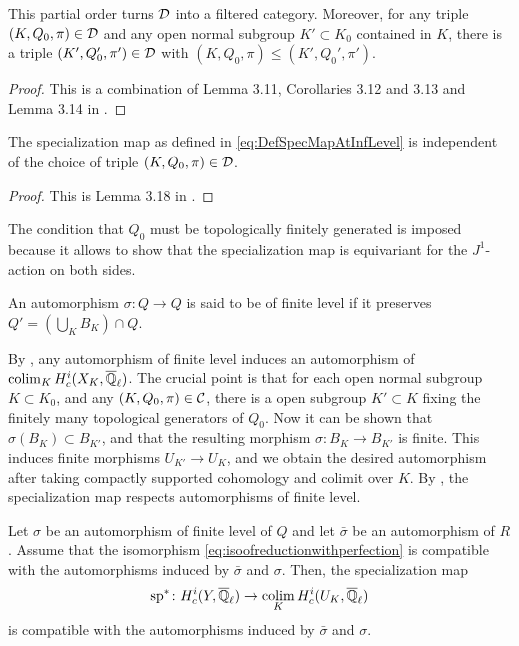 \documentclass[../main.tex]{subfiles}
\begin{document}
\begin{lem}\label{lem:MiedaCategoryOfChoicesIsFiltered}
  This partial order turns $\mathcal{D}$ into a filtered category. Moreover, for any
  triple $(K, Q_0, \pi) \in \mathcal{D}$ and any open normal subgroup $K' \subset K_0$ 
  contained in $K$, there is a triple $(K', Q_0', \pi') \in \mathcal{D}$ with $(K, Q_0,
  \pi) \leq (K', Q_0', \pi')$. 
\begin{proof}
  This is a combination of Lemma 3.11, Corollaries 3.12 and 3.13 and 
  Lemma 3.14 in \cite{mieda2016geometric}.
\end{proof}
\end{lem}

\begin{lem}\label{lem:specmapisindependentofchoice}
  The specialization map as defined in \eqref{eq:DefSpecMapAtInfLevel} is
  independent of the choice of triple $(K, Q_0, \pi) \in \mathcal{D}$. 
  \begin{proof}
    This is Lemma 3.18 in \cite{mieda2016geometric}.
  \end{proof}
\end{lem}

The condition that $Q_0$ must be topologically finitely generated is imposed 
because it allows to show that the specialization map is equivariant for the 
$J^1$-action on both sides. 

\begin{defi}\label{def:MorphismOfFinLevel}
  An automorphism $\sigma\colon Q \to Q$ is said to be of finite level if it 
  preserves $Q' = (\bigcup_K B_K)\cap Q$. 
\end{defi}

By \cite[Lemma 3.20]{mieda2016geometric}, any automorphism of finite level
induces an automorphism of $\operatorname*{colim}_K H^i_c(X_K, {\overline {\mathbb{Q}}_\ell})$. The crucial point 
is that for each open normal subgroup $K \subset K_0$, and any 
$(K, Q_0, \pi) \in \mathcal{C}$, there is a open subgroup $K' \subset K$ fixing the 
finitely many topological generators of $Q_0$. Now it can be shown that 
$\sigma(B_K) \subset B_{K'}$, and that the resulting morphism
$\sigma\colon B_K \to B_{K'}$ is finite. This induces finite morphisms
$U_{K'} \to U_K$, and we obtain the desired automorphism after taking 
compactly supported cohomology and colimit over $K$. 
By \cite[Proposition 3.21]{mieda2016geometric}, the specialization map respects
automorphisms of finite level.

\begin{prop}\label{prop:SpecMapIsEquivariantWithFinLev}
  Let $\sigma$ be an automorphism of finite level of $Q$ and let 
  $\bar \sigma$ be an automorphism of $R$. Assume that the isomorphism
  \eqref{eq:isoofreductionwithperfection} is compatible with the automorphisms
  induced by $\bar \sigma$ and $\sigma$. Then, the specialization map
  \begin{equation*}
    \mathrm{sp}^* \colon H^i_c(Y, {\overline {\mathbb{Q}}_\ell}) \to \operatorname*{colim}_K H^i_c(U_K, {\overline {\mathbb{Q}}_\ell})
  \end{equation*}
  is compatible with the automorphisms induced by $\bar \sigma$ and 
  $\sigma$. 
\end{prop}
\end{document}
